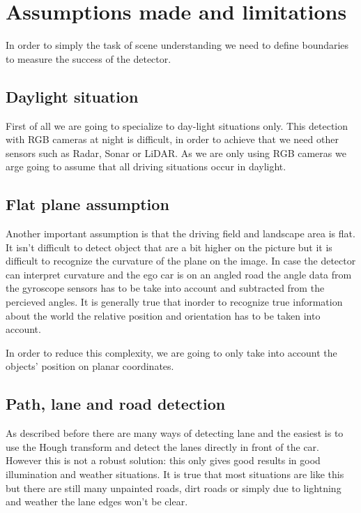 \chapter{Assumptions made and limitations}
\label{chap:assumptions}

In order to simply the task of scene understanding we need
to define boundaries to measure the success of the detector. 

\section{Daylight situation}

First of all we are going to specialize to day-light situations only. This
detection with RGB cameras at night is difficult, in order to achieve that we
need other sensors such as Radar, Sonar or LiDAR. As we are only using RGB
cameras we arge going to assume that all driving situations occur in daylight.

\section{Flat plane assumption}
Another important assumption is that the driving field and landscape area is
flat. It isn't difficult to detect object that are a bit higher on the picture
but it is difficult to recognize the curvature of the plane on the image. In
case the detector can interpret curvature and the ego car is on an angled road
the angle data from the gyroscope sensors has to be take into account and
subtracted from the percieved angles. It is generally true that inorder to
recognize true information about the world the relative position and orientation
has to be taken into account.

In order to reduce this complexity,  we are going to only take into account the
objects' position on planar coordinates.

\section{Path, lane and road detection}

As described before there are many ways of detecting lane and the easiest is to
use the Hough transform and detect the lanes directly in front of the car.
However this is not a robust solution: this only gives good results in good
illumination and weather situations. It is true that most situations are like
this but there are still many unpainted roads, dirt roads or simply due to
lightning and weather the lane edges won't be clear.

